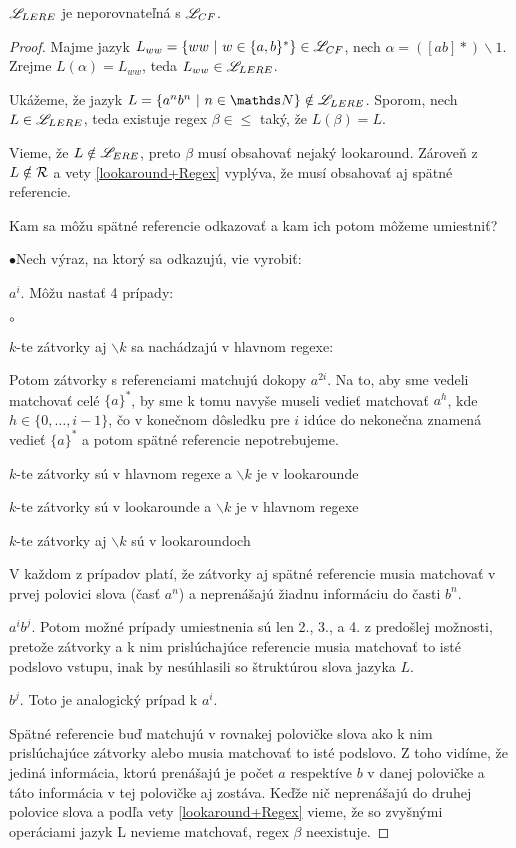 \begin{veta}\label{lelcf}
$\mathscr{L}_{LERE}$ je neporovnateľná s $ \mathscr{L}_{CF}$.
\end{veta}
\begin{proof}
Majme jazyk $L_{ww}=\lbrace ww~|~w \in \lbrace a,b \rbrace^* \rbrace \in \mathscr{L}_{CF}$, nech $ \alpha = ([ab]*)\backslash 1 $.
Zrejme $ L(\alpha) = L_{ww} $, teda $L_{ww}\in \mathscr{L}_{LERE}$.

Ukážeme, že jazyk $L=\lbrace a^nb^n~|~n \in \N \rbrace \notin \lel$. Sporom, nech $L \in \mathscr{L}_{LERE}$, teda existuje regex $\beta\in\le$ taký, že $L(\beta) = L$. 

Vieme, že $L \notin \mathscr{L}_{ERE}$, preto $\beta$ musí obsahovať nejaký lookaround. Zároveň z $L \notin {\cal R}$ a vety \ref{lookaround+Regex} vyplýva, že musí obsahovať aj spätné referencie.

Kam sa môžu spätné referencie odkazovať a kam ich potom môžeme umiestniť? 
\begin{list}{$\bullet$}{Nech výraz, na ktorý sa odkazujú, vie vyrobiť:}
\item $a^i$. Môžu nastať 4 prípady:
\begin{list}{$\circ$}{}
\item $k$-te zátvorky aj $\backslash k$ sa nachádzajú v hlavnom regexe:

Potom zátvorky s referenciami matchujú dokopy $a^{2i}$. Na to, aby sme vedeli matchovať celé $\lbrace a \rbrace^*$, by sme k tomu navyše museli vedieť matchovať $a^h$, kde $h\in\lbrace 0,\dots, i-1\rbrace$, čo v konečnom dôsledku pre $i$ idúce do nekonečna znamená vedieť $\lbrace a\rbrace^*$ a potom spätné referencie nepotrebujeme. 
\item $k$-te zátvorky sú v hlavnom regexe a $\backslash k$ je v lookarounde

\item $k$-te zátvorky sú v lookarounde a $\backslash k$ je v hlavnom regexe

\item $k$-te zátvorky aj $\backslash k$ sú v lookaroundoch
\end{list}
V každom z prípadov platí, že zátvorky aj spätné referencie musia matchovať v prvej polovici slova (časť $a^n$) a neprenášajú žiadnu informáciu do časti $b^n$.
\item $a^ib^j$. Potom možné prípady umiestnenia sú len 2., 3., a 4. z predošlej možnosti, pretože zátvorky a k nim prislúchajúce referencie musia matchovať to isté pod\-slo\-vo vstupu, inak by nesúhlasili so štruktúrou slova jazyka $L$.
\item $b^j$. Toto je analogický prípad k $a^i$.
\end{list}
Spätné referencie buď matchujú v rovnakej polovičke slova ako k nim prislúchajúce zátvorky alebo musia matchovať to isté podslovo. Z toho vidíme, že jediná informácia, ktorú prenášajú je počet $a$ respektíve $b$ v danej polovičke a táto informácia v tej polovičke aj zostáva. Keďže nič neprenášajú do druhej polovice slova a podľa vety \ref{lookaround+Regex} vieme, že so zvyšnými operáciami jazyk L nevieme matchovať, regex $\beta$ neexistuje.

\end{proof}

